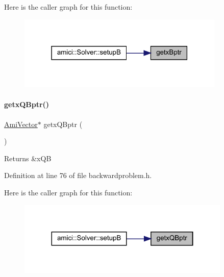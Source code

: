 Here is the caller graph for this function\+:
\nopagebreak
\begin{figure}[H]
\begin{center}
\leavevmode
\includegraphics[width=279pt]{classamici_1_1_backward_problem_afd910c853cb52a19b17ff8b65832fe2e_icgraph}
\end{center}
\end{figure}
\mbox{\label{classamici_1_1_backward_problem_a6b43b17396089785a111a5bc1fd27112}} 
\paragraph{\texorpdfstring{getxQBptr()}{getxQBptr()}}
{\footnotesize\ttfamily \mbox{\hyperlink{classamici_1_1_ami_vector}{Ami\+Vector}}$\ast$ getx\+Q\+Bptr (\begin{DoxyParamCaption}{ }\end{DoxyParamCaption})}

\begin{DoxyReturn}{Returns}
\&x\+QB 
\end{DoxyReturn}


Definition at line 76 of file backwardproblem.\+h.

Here is the caller graph for this function\+:
\nopagebreak
\begin{figure}[H]
\begin{center}
\leavevmode
\includegraphics[width=287pt]{classamici_1_1_backward_problem_a6b43b17396089785a111a5bc1fd27112_icgraph}
\end{center}
\end{figure}
\mbox{\label{classamici_1_1_backward_problem_ab1f652d5ffaf80adab677b0a8393b48a}} 
